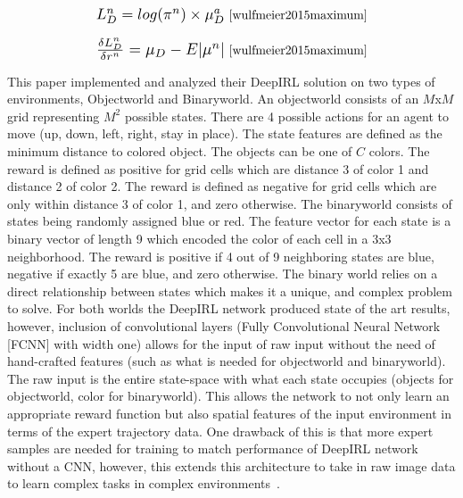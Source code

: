 \documentclass[12pt,american]{report}
\begin{document}
\begin{equation}
            \label{eq:maximum_entropy_loss}
            \resizebox{0.3\textwidth}{!}{$L_{D}^{n}=log(\pi^n) \times \mu_{D}^{a} $}~\cite{wulfmeier2015maximum}%
        \end{equation}

\begin{equation}
            \label{eq:maximum_entropy_gradient}
            \resizebox{0.3\textwidth}{!}{$\frac{\delta L_{D}^{n}}{\delta r^{n}}=\mu_D -  E|\mu^n|$}~\cite{wulfmeier2015maximum}%
        \end{equation}

This paper implemented and analyzed their DeepIRL solution on two types of environments, Objectworld and Binaryworld. An objectworld consists of an $M$x$M$ grid representing $M^2$ possible states.  There are 4 possible actions for an agent to move (up, down, left, right, stay in place). The state features are defined as the minimum distance to colored object.  The objects can be one of $C$ colors. The reward is defined as positive for grid cells which are distance 3 of color 1 and distance 2 of color 2. The reward is defined as negative for grid cells which are only within distance 3 of color 1, and zero otherwise.  The binaryworld consists of states being randomly assigned blue or red.  The feature vector for each state is a binary vector of length 9 which encoded the color of each cell in a 3x3 neighborhood. The reward is positive if 4 out of 9 neighboring states are blue, negative if exactly 5 are blue, and zero otherwise.  The binary world relies on a direct relationship between states which makes it a unique, and complex problem to solve. For both worlds the DeepIRL network produced state of the art results, however, inclusion of convolutional layers (Fully Convolutional Neural Network [FCNN] with width one) allows for the input of raw input without the need of hand-crafted features (such as what is needed for objectworld and binaryworld). The raw input is the entire state-space with what each state occupies (objects for objectworld, color for binaryworld). This allows the network to not only learn an appropriate reward function but also spatial features of the input environment in terms of the expert trajectory data.  One drawback of this is that more expert samples are needed for training to match performance of DeepIRL network without a CNN, however, this extends this architecture to take in raw image data to learn complex tasks in complex environments~\cite{wulfmeier2015maximum}.
\end{document}
